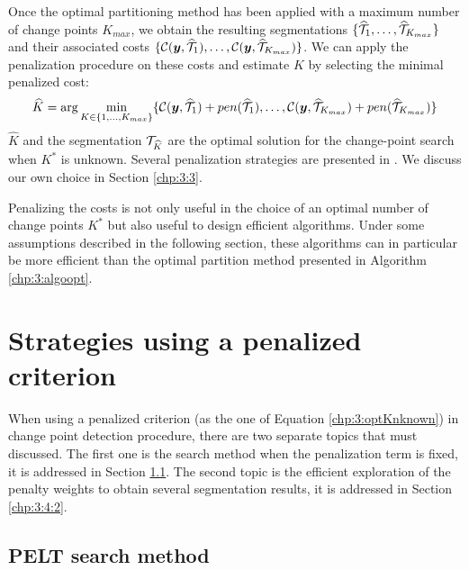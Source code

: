 \begin{itemize}
\begin{equation}
\end{equation}   
Once the optimal partitioning method has been applied with a maximum number of change points $K_{max}$, we obtain the resulting segmentations $\{\widehat{{\mathcal T}}_1,\dots,\widehat{{\mathcal T}}_{K_{max}}\}$ and their associated costs $\{{\mathcal C}(\bm y, \widehat{{\mathcal T}}_1),\dots,{\mathcal C}(\bm y, \widehat{{\mathcal T}}_{K_{max}})\}$. We can apply the penalization procedure on these costs and estimate $K$ by selecting the minimal penalized cost:
\begin{equation}\label{chp:3:Khat}
\widehat{K} = \arg\min_{K \in \{1,\dots,K_{max}\}} \{{\mathcal C}(\bm y, \widehat{{\mathcal T}}_1)+pen(\widehat{{\mathcal T}}_1),\dots,{\mathcal C}(\bm y, \widehat{{\mathcal T}}_{K_{max}})+pen(\widehat{{\mathcal T}}_{K_{max}})\} 
\end{equation}
$\widehat{K}$ and the segmentation ${\mathcal T}_{\widehat{K}}$ are the optimal solution for the change-point search when $K^*$ is unknown. Several penalization strategies are presented in \cite{truong2020}. We discuss our own choice in Section \ref{chp:3:3}.  
\end{itemize}    

Penalizing the costs is not only useful in the choice of an optimal number of change points $K^*$ but also useful to design efficient algorithms. Under some assumptions described in the following section, these algorithms can in particular be more efficient than the optimal partition method presented in Algorithm \ref{chp:3:algoopt}. 

\section{Strategies using a penalized criterion}\label{chp:3:4}

When using a penalized criterion (as the one of Equation \eqref{chp:3:optKnknown}) in change point detection procedure, there are two separate topics that must discussed. The first one is the search method when the penalization term is fixed, it is addressed in Section \ref{chp:3:4:1}. The second topic is the efficient exploration of the penalty weights to obtain several segmentation results, it is addressed in Section \ref{chp:3:4:2}.   

\subsection{PELT search method}\label{chp:3:4:1}

